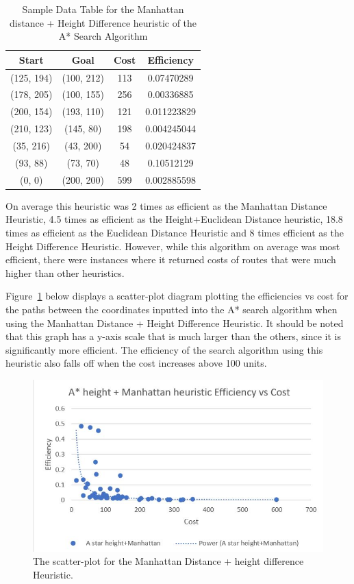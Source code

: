 \documentclass[11pt,oneside]{article}
\begin{document}
\begin{table}[H]
    \centering
    \begin{tabular}{|c|c|c|c|}
        Start        & Goal       & Cost & Efficiency \\ \hline
        (125, 194)   & (100, 212) & 113 & 0.07470289 \\
        (178, 205)   & (100, 155) & 256 & 0.00336885 \\
        (200, 154)   & (193, 110) & 121 & 0.011223829 \\
        (210, 123)   & (145, 80)  & 198 & 0.004245044 \\
        (35, 216)    & (43, 200)  & 54 & 0.020424837 \\
        (93, 88)     & (73, 70)   & 48 & 0.10512129 \\
        (0, 0)       & (200, 200) & 599 & 0.002885598 \\
    \end{tabular}
    \caption{Sample Data Table for the Manhattan distance + Height Difference heuristic of the A* Search Algorithm}
    \label{tab:my_label}
\end{table}

On average this heuristic was 2 times as efficient as the Manhattan Distance Heuristic, 4.5 times as efficient as the Height+Euclidean Distance heuristic, 18.8 times as efficient as the Euclidean Distance Heuristic and 8 times efficient as the Height Difference Heuristic. However, while this algorithm on average was most efficient, there were instances where it returned costs of routes that were much higher than other heuristics.

Figure~\ref{fig:MDHDEvC} below displays a scatter-plot diagram plotting the efficiencies vs cost for the paths between the coordinates inputted into the A* search algorithm when using the Manhattan Distance + Height Difference Heuristic. It should be noted that this graph has a y-axis scale that is much larger than the others, since it is significantly more efficient. The efficiency of the search algorithm using this heuristic also falls off when the cost increases above 100 units.

\begin{figure}[H]
    \centering
      \includegraphics[scale=0.8]{MD+HD efficiency vs cost.JPG}
      \caption{The scatter-plot for the Manhattan Distance + height difference Heuristic.}
      \label{fig:MDHDEvC}
    \end{figure} 
    
\end{document}
